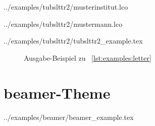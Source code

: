 {  %
    {../examples/tubslttr2/musterinstitut.lco}
  
    {../examples/tubslttr2/mustermann.lco}
  
\clearpage
    {../examples/tubslttr2/tubslttr2_example.tex}

  \begin{figure}\centering
    \begin{minipage}{0.49\textwidth}
    \end{minipage}\hfill
    \begin{minipage}{0.49\textwidth}
    \end{minipage}
    \caption{Ausgabe-Beispiel zu \lstlistingname~\ref{lst:examples:letter}}
    \label{fig:examples:letter:mustermann}
  \end{figure}

  
\clearpage
\section{beamer-Theme}

    {../examples/beamer/beamer_example.tex}
  
}
